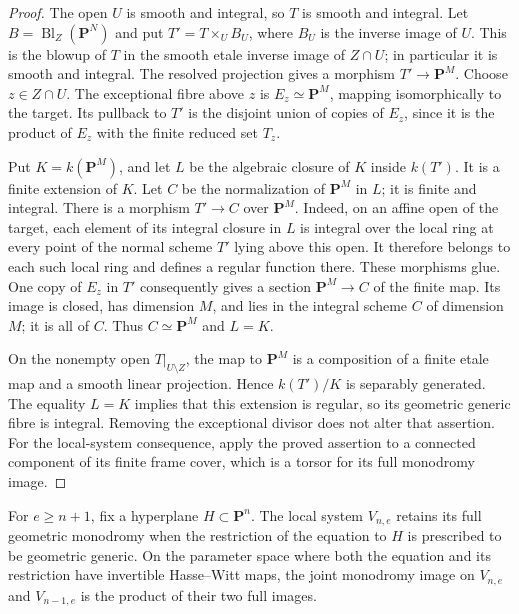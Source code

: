 \begin{proof}
The open $U$ is smooth and integral, so $T$ is smooth and integral.
Let $B=\operatorname{Bl}_Z(\mathbf P^N)$ and put
$T'=T\times_U B_U$, where $B_U$ is the inverse image of $U$.
This is the blowup of $T$ in the smooth etale inverse image of
$Z\cap U$; in particular it is smooth and integral.  The resolved
projection gives a morphism $T'\to\mathbf P^M$.
Choose $z\in Z\cap U$.  The exceptional fibre above $z$ is
$E_z\simeq\mathbf P^M$, mapping isomorphically to the target.
Its pullback to $T'$ is the disjoint union of copies of $E_z$,
since it is the product of $E_z$ with the finite reduced set $T_z$.

Put $K=k(\mathbf P^M)$, and let $L$ be the algebraic closure of $K$
inside $k(T')$.  It is a finite extension of $K$.  Let $C$ be the
normalization of $\mathbf P^M$ in $L$; it is finite and integral.
There is a morphism $T'\to C$ over $\mathbf P^M$.  Indeed, on an
affine open of the target, each element of its integral closure
in $L$ is integral over the local ring at every point of the
normal scheme $T'$ lying above this open.  It therefore belongs
to each such local ring and defines a regular function there.
These morphisms glue.  One copy of $E_z$ in $T'$ consequently
gives a section $\mathbf P^M\to C$ of the finite map.
Its image is closed, has dimension $M$, and lies in the integral
scheme $C$ of dimension $M$; it is all of $C$.  Thus $C\simeq
\mathbf P^M$ and $L=K$.

On the nonempty open $T|_{U\setminus Z}$, the map to $\mathbf P^M$
is a composition of a finite etale map and a smooth linear
projection.  Hence $k(T')/K$ is separably generated.  The equality
$L=K$ implies that this extension is regular, so its geometric
generic fibre is integral.  Removing the exceptional divisor
does not alter that assertion.  For the local-system consequence,
apply the proved assertion to a connected component of its finite
frame cover, which is a torsor for its full monodromy image.
\end{proof}

\begin{corollary}\label{cor:restriction-independent-monodromy}
For $e\geq n+1$, fix a hyperplane $H\subset\mathbf P^n$.
The local system $V_{n,e}$ retains its full geometric monodromy
when the restriction of the equation to $H$ is prescribed to be
geometric generic.  On the parameter space where both the
equation and its restriction have invertible Hasse--Witt maps,
the joint monodromy image on $V_{n,e}$ and $V_{n-1,e}$ is the
product of their two full images.
\end{corollary}

